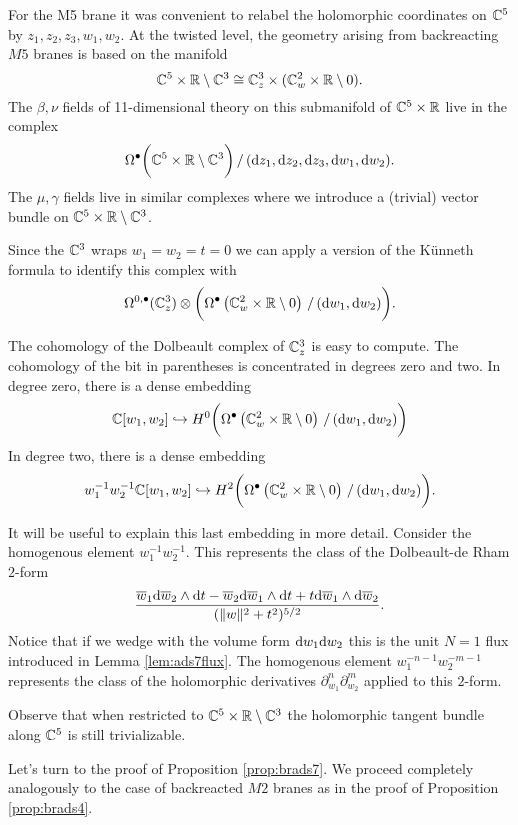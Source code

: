 For the M5 brane it was convenient to relabel the holomorphic coordinates on $\mathbb C^5$ by $z_1,z_2,z_3,w_1,w_2$. 
At the twisted level, the geometry arising from backreacting $M5$ branes is based on the manifold 
\[
\mathbb C^5 \times \mathbb R \setminus \mathbb C^3 \cong \mathbb C_z^3 \times (\mathbb C^2_w \times \mathbb R \setminus 0) .
\]
The $\beta,\nu$ fields of 11-dimensional theory on this submanifold of $\mathbb C^5 \times \mathbb R$ live in the complex 
\[
\Omega^\bullet\bigg(\mathbb C^5 \times \mathbb R \setminus \mathbb C^3\bigg) \, / \, ({\rm d} z_1,{\rm d} z_2,{\rm d} z_3, {\rm d} w_1, {\rm d} w_2)  .
\]
The $\mu,\gamma$ fields live in similar complexes where we introduce a (trivial) vector bundle on $\mathbb C^5 \times \mathbb R \setminus \mathbb C^3$. 

Since the $\mathbb C^3$ wraps $w_1=w_2=t=0$ we can apply a version of the K\"unneth formula to identify this complex with 
\[
\Omega^{0,\bullet}(\mathbb C^3_z) \otimes \bigg( \Omega^\bullet\left(\mathbb C^2_w \times \mathbb R \setminus 0 \right) \, / \, ({\rm d} w_1, {\rm d} w_2) \bigg).
\]

The cohomology of the Dolbeault complex of $\mathbb C^3_z$ is easy to compute. 
The cohomology of the bit in parentheses is concentrated in degrees zero and two. 
In degree zero, there is a dense embedding
\[
\mathbb C[w_1,w_2] \hookrightarrow H^0 \bigg( \Omega^\bullet\left(\mathbb C^2_w \times \mathbb R \setminus 0 \right) \, / \, ({\rm d} w_1, {\rm d} w_2) \bigg)
\]
In degree two, there is a dense embedding
\[
w_{1}^{-1} w_2^{-1} \mathbb C[w_1,w_2] \hookrightarrow H^2 \bigg( \Omega^\bullet\left(\mathbb C^2_w \times \mathbb R \setminus 0 \right) \, / \, ({\rm d} w_1, {\rm d} w_2) \bigg).
\]

It will be useful to explain this last embedding in more detail. 
Consider the homogenous element $w_1^{-1} w_2^{-1}$. 
This represents the class of the Dolbeault-de Rham $2$-form
\[
\frac{\overline{w}_1 {\rm d} \overline{w}_2 \wedge {\rm d} t - \overline{w}_2 {\rm d} \overline{w}_1 \wedge {\rm d} t + t {\rm d} \overline{w}_1 \wedge {\rm d} \overline{w}_2}{(\|w\|^2 + t^2)^{5/2}} .
\]
Notice that if we wedge with the volume form ${\rm d} w_1 {\rm d} w_2$ this is the unit $N=1$ flux introduced in Lemma \ref{lem:ads7flux}. 
The homogenous element $w_1^{-n-1} w_2^{-m-1}$ represents the class of the holomorphic derivatives $\partial_{w_1}^n \partial_{w_2}^{m}$ applied to this $2$-form. 

Observe that when restricted to $\mathbb C^5 \times \mathbb R \setminus \mathbb C^3$ the holomorphic tangent bundle along $\mathbb C^5$ is still trivializable. 

\parsec[]

Let's turn to the proof of Proposition \ref{prop:brads7}.
We proceed completely analogously to the case of backreacted $M2$ branes as in the proof of Proposition \ref{prop:brads4}. 

